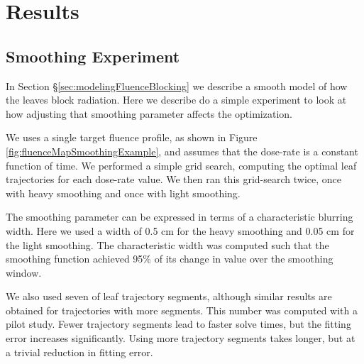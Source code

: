 \section{Results}


\subsection{Smoothing Experiment}

In Section \S\ref{sec:modelingFluenceBlocking} we describe a smooth model of how the leaves block radiation.
Here we describe do a simple experiment to look at how adjusting that smoothing parameter affects the optimization.

We uses a single target fluence profile, as shown in Figure \ref{fig:fluenceMapSmoothingExample},
and assumes that the dose-rate is a constant function of time.
We performed a simple grid search, computing the optimal leaf trajectories for each dose-rate value.
We then ran this grid-search twice, once with heavy smoothing and once with light smoothing.

The smoothing parameter can be expressed in terms of a characteristic blurring width.
Here we used a width of 0.5 cm for the heavy smoothing and 0.05 cm for the light smoothing.
The characteristic width was computed such that the smoothing function achieved 95\% of its
change in value over the smoothing window.

We also used seven of leaf trajectory segments, although similar results are obtained for trajectories with more segments.
This number was computed with a pilot study.
Fewer trajectory segments lead to faster solve times, but the fitting error increases significantly.
Using more trajectory segments takes longer, but at a trivial reduction in fitting error.


